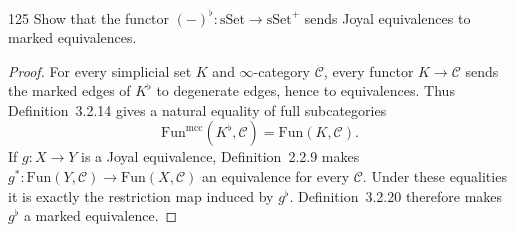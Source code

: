 \begin{exercise}{125}
Show that the functor $(-)^{\flat}\colon\mathrm{sSet}\to\mathrm{sSet}^{+}$ sends Joyal equivalences to
marked equivalences.

\begin{proof}
For every simplicial set $K$ and $\infty$-category $\mathcal C$, every
functor $K\to\mathcal C$ sends the marked edges of $K^{\flat}$ to
degenerate edges, hence to equivalences.
Thus Definition~3.2.14 gives a natural equality of full subcategories
\[
 \mathrm{Fun}^{\mathrm{mcc}}(K^{\flat},\mathcal C)
 =\mathrm{Fun}(K,\mathcal C).
\]
If $g\colon X\to Y$ is a Joyal equivalence, Definition~2.2.9 makes
$g^*\colon\mathrm{Fun}(Y,\mathcal C)\to\mathrm{Fun}(X,\mathcal C)$
an equivalence for every $\mathcal C$.
Under these equalities it is exactly the restriction map induced by $g^{\flat}$.
Definition~3.2.20 therefore makes $g^{\flat}$ a marked equivalence.
\end{proof}
\end{exercise}
